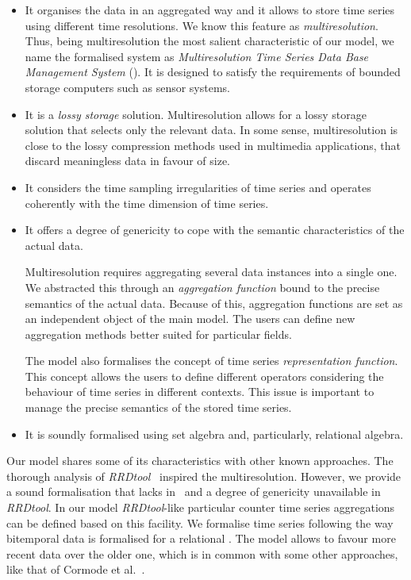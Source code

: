 \begin{itemize}

\item It organises the data in an aggregated way and it allows to
  store time series using different time resolutions. We know this
  feature as \emph{multiresolution}.  Thus, being multiresolution the
  most salient characteristic of our model, we name the formalised
  system as \emph{Multiresolution Time Series Data Base Management
    System} ().  It is designed to satisfy the
  requirements of bounded storage computers such as sensor systems.

\item It is a \emph{lossy storage} solution. Multiresolution allows
  for a lossy storage solution that selects only the relevant data. In
  some sense, multiresolution is close to the lossy compression
  methods used in multimedia applications, that discard meaningless
  data in favour of size.

\item It considers the time sampling irregularities of time series and
  operates coherently with the time dimension of time series.

\item It offers a degree of genericity to cope with the semantic
  characteristics of the actual data.

  Multiresolution requires aggregating several data instances into a
  single one. We abstracted this through an \emph{aggregation
    function} bound to the precise semantics of the actual
  data. Because of this, aggregation functions are set as an
  independent object of the main model.  The users can define new
  aggregation methods better suited for particular fields.

  The model also formalises the concept of time series
  \emph{representation function}.  This concept allows the users to
  define different operators considering the behaviour of time series
  in different contexts. This issue is important to manage the precise
  semantics of the stored time series.

\item It is soundly formalised using set algebra and, particularly,
  relational algebra.

\end{itemize}


Our model shares some of its characteristics with other known
approaches. The thorough analysis of \emph{RRDtool}~\cite{rrdtool}
inspired the multiresolution. However, we provide a sound
formalisation that lacks in~\cite{rrdtool} and a degree of genericity
unavailable in \emph{RRDtool}. In our model \emph{RRDtool}-like
particular counter time series aggregations can be defined based on
this facility. We formalise time series following the way bitemporal
data is formalised for a relational . The model allows to
favour more recent data over the older one, which is in common with
some other approaches, like that of Cormode et
al.~\cite{cormode08:pods}.

